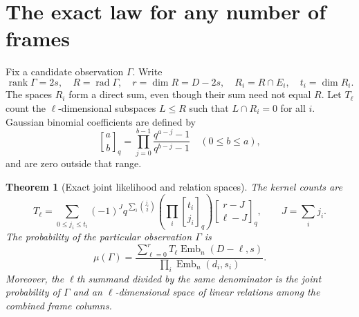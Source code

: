 \documentclass[11pt,letterpaper]{article}
\newtheorem{theorem}{Theorem}[section]
\theoremstyle{definition}
\theoremstyle{remark}
\newcommand{\rank}{\operatorname{rank}}
\newcommand{\rad}{\operatorname{rad}}
\newcommand{\Emb}{\operatorname{Emb}}
\newcommand{\qb}[2]{\genfrac{[}{]}{0pt}{}{#1}{#2}_{q}}
\begin{document}
\section{The exact law for any number of frames}

Fix a candidate observation $\Gamma$. Write
\[
 \rank\Gamma=2s,\quad R=\rad\Gamma,\quad r=\dim R=D-2s,
 \quad R_i=R\cap E_i,\quad t_i=\dim R_i.
\]
The spaces $R_i$ form a direct sum, even though their sum need not equal $R$. Let $T_\ell$ count the $\ell$-dimensional subspaces $L\le R$ such that $L\cap R_i=0$ for all $i$. Gaussian binomial coefficients are defined by
\[
 \qb ab=\prod_{j=0}^{b-1}\frac{q^{a-j}-1}{q^{b-j}-1}
 \quad(0\le b\le a),
\]
and are zero outside that range.

\begin{theorem}[Exact joint likelihood and relation spaces]\label{thm:exact}
The kernel counts are
\begin{equation}\label{eq:mobius}
 T_\ell=
 \sum_{0\le j_i\le t_i}
 (-1)^Jq^{\sum_i\binom{j_i}2}
 \left(\prod_i\qb{t_i}{j_i}\right)
 \qb{r-J}{\ell-J},\qquad J=\sum_i j_i.
\end{equation}
The probability of the particular observation $\Gamma$ is
\begin{equation}\label{eq:exact}
 \mu(\Gamma)=
 \frac{\displaystyle\sum_{\ell=0}^{r}T_\ell\Emb_n(D-\ell,s)}
 {\displaystyle\prod_i\Emb_n(d_i,s_i)}.
\end{equation}
Moreover, the $\ell$th summand divided by the same denominator is the joint probability of $\Gamma$ and an $\ell$-dimensional space of linear relations among the combined frame columns.
\end{theorem}
\end{document}
